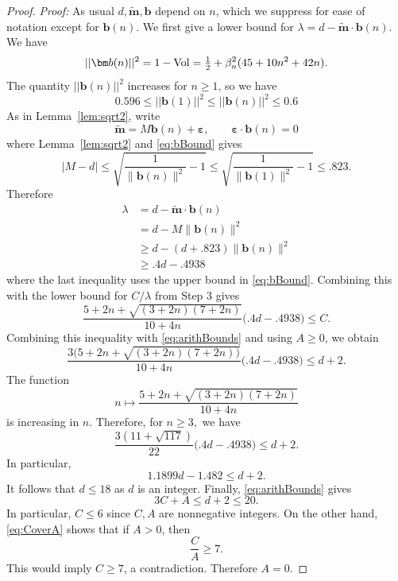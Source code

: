\documentclass[11pt, reqno]{amsart}
\theoremstyle{remark}
\numberwithin{equation}{subsection}
\numberwithin{figure}{section}
\theoremstyle{customremark}
\newcommand{\Vol}{{\rm Vol}}
\newcommand{\NI}{{\noindent}}
\newcommand{\bE}{{\mathbb E}}
\newcommand{\be}{{\beta}}
\newcommand{\MS}{{\medskip}}
\newcommand{\eps}{\varepsilon}
\newcommand{\btm}{\widetilde{\bm{m}}}
\begin{document}
\begin{proof}
\NI {\it Proof:} As usual $d,\btm,\bm{b}$ depend on $n$, which we suppress for ease of notation except for $\bm{b}(n).$   We first give a lower bound for $\lambda=d-\widetilde{\bm m} \cdot \bm{b}(n)$. 
We have
     \[ ||\bm b(n)||^2=1-\Vol=\tfrac{1}{2}+\be_n^2(45+10n^2+42n).\]
     The quantity $||\bm b(n)||^2$ increases for $n \geq 1$, so we have
     \begin{equation} \label{eq:bBound}
     0.596\leq ||\bm b(1)||^2 \leq ||\bm b(n)||^2 \leq 0.6 
     \end{equation}
     As in Lemma~\ref{lem:sqrt2}, write
\[
        \widetilde{\bm m}=M\bm b(n)+\bm\eps,
        \qquad
        \bm\eps\cdot\bm b(n)=0
\]
where Lemma~\ref{lem:sqrt2} and \eqref{eq:bBound} gives 
\[
        |M-d|\leq \sqrt{\frac{1}{\|\bm b(n)\|^2}-1}\leq \sqrt{\frac{1}{\|\bm b(1)\|^2}-1}\leq  .823.
\]
Therefore
\begin{align*}
        \lambda
        &=
        d-\widetilde{\bm m}\cdot\bm b(n)\\
        &=
        d-M\|\bm b(n)\|^2\\
        &\geq
        d-(d+.823)\|\bm b(n)\|^2\\
        &\geq
        .4d-.4938
\end{align*}
where the last inequality uses the upper bound in \eqref{eq:bBound}.
Combining this with the lower bound for $C/\lambda$ from Step 3 gives
\[
        \frac{5+2n+\sqrt{(3+2n)(7+2n)}}{10+4n}
        \bigl(.4d-.4938\bigr) \leq C.
\]
Combining this inequality with \eqref{eq:arithBounds} and using $A\geq0$, we obtain
\[
        \frac{3(5+2n+\sqrt{(3+2n)(7+2n))}}{10+4n}
        \bigl(.4d-.4938\bigr)
        \leq d+2.
\]
The function
\[
        n\mapsto \frac{5+2n+\sqrt{(3+2n)(7+2n)}}{10+4n}
\]
is increasing in $n$. Therefore, for $n \geq 3,$ we have
\[
        \frac{3(11+\sqrt{117})}{22}\bigl(.4d-.4938\bigr)\leq d+2.
\]
In particular,
\[
        1.1899d-1.482\leq d+2.
\]
It follows that $d\leq18$ as $d$ is an integer. Finally, \eqref{eq:arithBounds} gives
\[
        3C+A\leq d+2\leq20.
\]
In particular, $C\leq6$ since $C,A$ are nonnegative integers.  On the other hand, \eqref{eq:CoverA} shows that if $A>0$, then
\[
        \frac{C}{A}\geq7.
\]
This would imply $C\geq7$, a contradiction.
Therefore $A=0$.


\end{proof}
\end{document}
